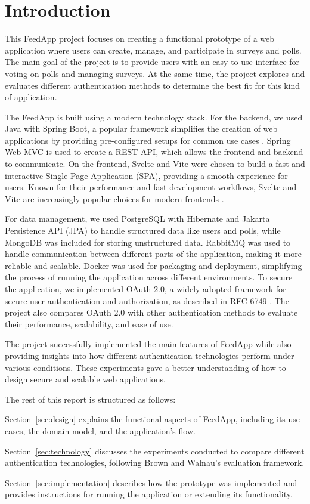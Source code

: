\section{Introduction}
\label{sec:introduction}

This FeedApp project focuses on creating a functional prototype of a web application where users can create, manage, and participate in surveys and polls. The main goal of the project is to provide users with an easy-to-use interface for voting on polls and managing surveys. At the same time, the project explores and evaluates different authentication methods to determine the best fit for this kind of application.

The FeedApp is built using a modern technology stack. For the backend, we used Java with Spring Boot, a popular framework simplifies the creation of web applications by providing pre-configured setups for common use cases \cite{springboot}. Spring Web MVC is used to create a REST API, which allows the frontend and backend to communicate. On the frontend, Svelte and Vite were chosen to build a fast and interactive Single Page Application (SPA), providing a smooth experience for users. Known for their performance and fast development workflows, Svelte and Vite are increasingly popular choices for modern frontends \cite{svelte,vite}.

For data management, we used PostgreSQL with Hibernate and Jakarta Persistence API (JPA) to handle structured data like users and polls, while MongoDB was included for storing unstructured data. RabbitMQ was used to handle communication between different parts of the application, making it more reliable and scalable. Docker was used for packaging and deployment, simplifying the process of running the application across different environments. To secure the application, we implemented OAuth 2.0, a widely adopted framework for secure user authentication and authorization, as described in RFC 6749 \cite{oauth2spec}. The project also compares OAuth 2.0 with other authentication methods to evaluate their performance, scalability, and ease of use.

The project successfully implemented the main features of FeedApp while also providing insights into how different authentication technologies perform under various conditions. These experiments gave a better understanding of how to design secure and scalable web applications.

The rest of this report is structured as follows:

Section~\ref{sec:design} explains the functional aspects of FeedApp, including its use cases, the domain model, and the application’s flow.

Section~\ref{sec:technology} discusses the experiments conducted to compare different authentication technologies, following Brown and Walnau’s evaluation framework.

Section~\ref{sec:implementation} describes how the prototype was implemented and provides instructions for running the application or extending its functionality.